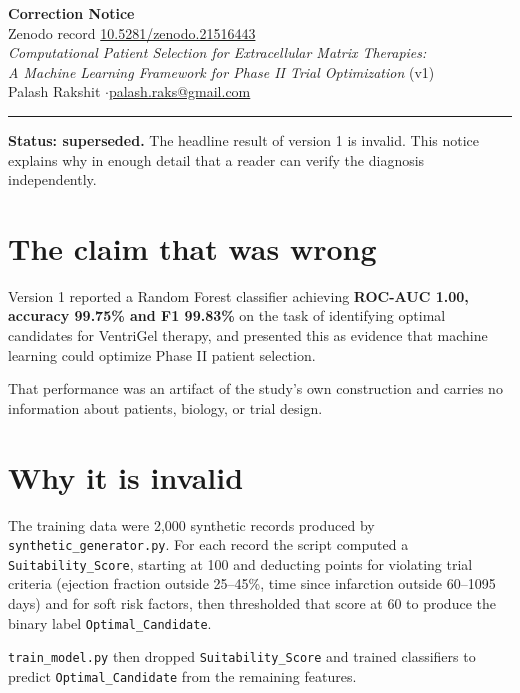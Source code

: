 \documentclass[11pt,letterpaper]{article}
\begin{document}
\begin{center}
{\LARGE\bfseries Correction Notice}\\[6pt]
{\large Zenodo record \href{https://doi.org/10.5281/zenodo.21516443}{10.5281/zenodo.21516443}}\\[10pt]
\textit{Computational Patient Selection for Extracellular Matrix Therapies:\\
A Machine Learning Framework for Phase II Trial Optimization} (v1)\\[8pt]
Palash Rakshit \quad$\cdot$\quad \href{mailto:palash.raks@gmail.com}{palash.raks@gmail.com}
\end{center}

\vspace{6pt}
\hrule
\vspace{10pt}

\textbf{Status: superseded.} The headline result of version 1 is invalid. This notice explains why in
enough detail that a reader can verify the diagnosis independently.

\section{The claim that was wrong}

Version 1 reported a Random Forest classifier achieving \textbf{ROC-AUC 1.00, accuracy 99.75\% and
F1 99.83\%} on the task of identifying optimal candidates for VentriGel therapy, and presented this
as evidence that machine learning could optimize Phase II patient selection.

That performance was an artifact of the study's own construction and carries no information about
patients, biology, or trial design.

\section{Why it is invalid}

The training data were 2{,}000 synthetic records produced by \texttt{synthetic\_generator.py}. For
each record the script computed a \texttt{Suitability\_Score}, starting at 100 and deducting points
for violating trial criteria (ejection fraction outside 25--45\%, time since infarction outside
60--1095 days) and for soft risk factors, then thresholded that score at 60 to produce the binary
label \texttt{Optimal\_Candidate}.

\texttt{train\_model.py} then dropped \texttt{Suitability\_Score} and trained classifiers to predict
\texttt{Optimal\_Candidate} from the remaining features.
\end{document}
